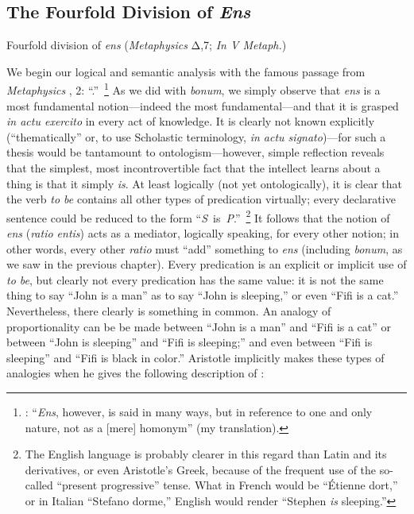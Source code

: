 \subsection{The Fourfold Division of \emph{Ens}}
\label{fourfold-division}

\begin{DONE}
Fourfold division of \emph{ens} (\emph{Metaphysics} Δ,7; \emph{In V Metaph.})
\end{DONE}

We begin our logical and semantic analysis with the famous passage from \emph{Metaphysics} , 2: ``.''\,%
%
\footnote{\Cite[, 2, 1003a33-24]{aristotle:metaphysics}:  ``\emph{Ens}, however, is said in many ways, but in reference to one and only nature, not as a [mere] homonym'' (my translation).} As we did with \emph{bonum}, we simply observe that \emph{ens}  is a most fundamental notion---indeed the most fundamental---and that it is grasped \emph{in actu exercito} in every act of knowledge. It is clearly not known explicitly (``thematically'' or, to use Scholastic terminology, \emph{in actu signato})---for such a thesis would be tantamount to ontologism---however, simple reflection reveals that the simplest, most incontrovertible fact that the intellect learns about a thing is that it simply \emph{is}. At least logically (not yet ontologically), it is clear that the verb \emph{to be} contains all other types of predication virtually; every declarative sentence could be reduced to the form ``\emph{S}~is~\emph{P}.''\,%
%
\footnote{The English language is probably clearer in this regard than Latin and its derivatives, or even Aristotle's Greek, because of the frequent use of the so-called ``present progressive'' tense. What in French would be ``Étienne dort,'' or in Italian ``Stefano dorme,'' English would render ``Stephen \emph{is} sleeping.''} It follows that the notion of \emph{ens} (\emph{ratio entis}) acts as a mediator, logically speaking, for every other notion; in other words, every other \emph{ratio} must ``add'' something to \emph{ens} (including \emph{bonum}, as we saw in the previous chapter). Every predication is an explicit or implicit use of \emph{to be}, but clearly not every predication has the same value: it is not the same thing to say ``John is a man'' as to say ``John is sleeping,'' or even ``Fifi is a cat.'' Nevertheless, there clearly is something in common. An analogy of proportionality can be be made between ``John is a man'' and ``Fifi is a cat'' or between ``John is sleeping'' and ``Fifi is sleeping;'' and even between ``Fifi is sleeping'' and ``Fifi is black in color.'' Aristotle implicitly makes these types of analogies when he gives the following description of :

